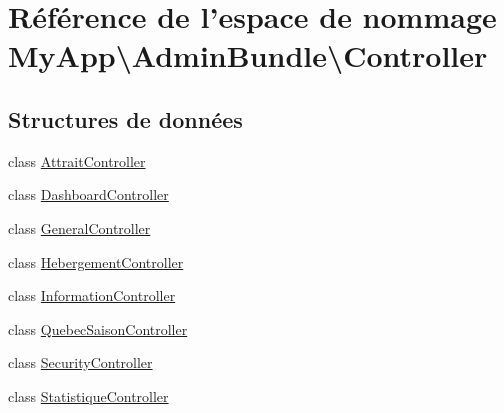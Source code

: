 \hypertarget{namespace_my_app_1_1_admin_bundle_1_1_controller}{\section{Référence de l'espace de nommage My\-App\textbackslash{}Admin\-Bundle\textbackslash{}Controller}
\label{namespace_my_app_1_1_admin_bundle_1_1_controller}
}
\subsection*{Structures de données}
\begin{DoxyCompactItemize}
\item 
class \hyperlink{class_my_app_1_1_admin_bundle_1_1_controller_1_1_attrait_controller}{Attrait\-Controller}
\item 
class \hyperlink{class_my_app_1_1_admin_bundle_1_1_controller_1_1_dashboard_controller}{Dashboard\-Controller}
\item 
class \hyperlink{class_my_app_1_1_admin_bundle_1_1_controller_1_1_general_controller}{General\-Controller}
\item 
class \hyperlink{class_my_app_1_1_admin_bundle_1_1_controller_1_1_hebergement_controller}{Hebergement\-Controller}
\item 
class \hyperlink{class_my_app_1_1_admin_bundle_1_1_controller_1_1_information_controller}{Information\-Controller}
\item 
class \hyperlink{class_my_app_1_1_admin_bundle_1_1_controller_1_1_quebec_saison_controller}{Quebec\-Saison\-Controller}
\item 
class \hyperlink{class_my_app_1_1_admin_bundle_1_1_controller_1_1_security_controller}{Security\-Controller}
\item 
class \hyperlink{class_my_app_1_1_admin_bundle_1_1_controller_1_1_statistique_controller}{Statistique\-Controller}
\end{DoxyCompactItemize}
